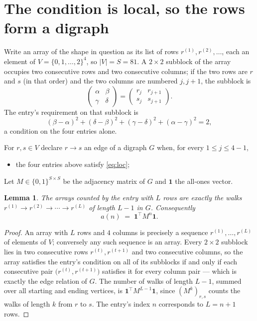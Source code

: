 \documentclass[11pt,a4paper]{article}
\theoremstyle{plain}
\newtheorem{lemma}[theorem]{Lemma}
\theoremstyle{definition}
\begin{document}
\section{The condition is local, so the rows form a digraph}

Write an array of the shape in question as its list of rows
$r^{(1)},r^{(2)},\dots$, each an element of
$V=\{0,1,\dots,2\}^{4}$, so $|V|=S=81$. A $2\times2$ subblock of the array
occupies two consecutive rows and two consecutive columns; if the two rows are $r$
and $s$ (in that order) and the two columns are numbered $j,j+1$,
the subblock is
\[
\begin{pmatrix}\alpha&\beta\\\gamma&\delta\end{pmatrix}=\begin{pmatrix}r_j&r_{j+1}\\s_j&s_{j+1}\end{pmatrix}.
\]
The entry's requirement on that subblock is
\begin{equation}\label{eq:loc}
(\beta-\alpha)^2+(\delta-\beta)^2+(\gamma-\delta)^2+(\alpha-\gamma)^2=2,
\end{equation}
a condition on the four entries alone.

For $r,s\in V$ declare $r\to s$ an edge of a digraph $G$ when, for every
$1\le j\le 4-1$,
\begin{itemize}
\item the four entries above satisfy \eqref{eq:loc};

\end{itemize}
Let $M\in\{0,1\}^{S\times S}$ be the adjacency matrix of $G$ and $\mathbf{1}$ the
all-ones vector.

\begin{lemma}\label{lem:walk}
The arrays counted by the entry with $L$ rows are exactly the walks
$r^{(1)}\to r^{(2)}\to\cdots\to r^{(L)}$ of length $L-1$ in $G$. Consequently
\[
a(n)\;=\;\mathbf{1}^{\!\top}M^{n}\mathbf{1} .
\]
\end{lemma}

\begin{proof}
An array with $L$ rows and $4$ columns is precisely a sequence
$r^{(1)},\dots,r^{(L)}$ of elements of $V$; conversely any such sequence is an array.
Every $2\times2$ subblock lies in two consecutive rows $r^{(t)},r^{(t+1)}$ and two
consecutive columns, so the array satisfies the entry's condition on all of its subblocks
if and only if each consecutive pair $\bigl(r^{(t)},r^{(t+1)}\bigr)$ satisfies it for
every column pair --- which is exactly the edge relation of $G$. The number of walks of
length $L-1$, summed over all starting and ending vertices, is
$\mathbf{1}^{\!\top}M^{L-1}\mathbf{1}$, since $(M^{k})_{r,s}$ counts the walks of
length $k$ from $r$ to $s$. The entry's index $n$ corresponds to $L=n+1$ rows.
\end{proof}
\end{document}
